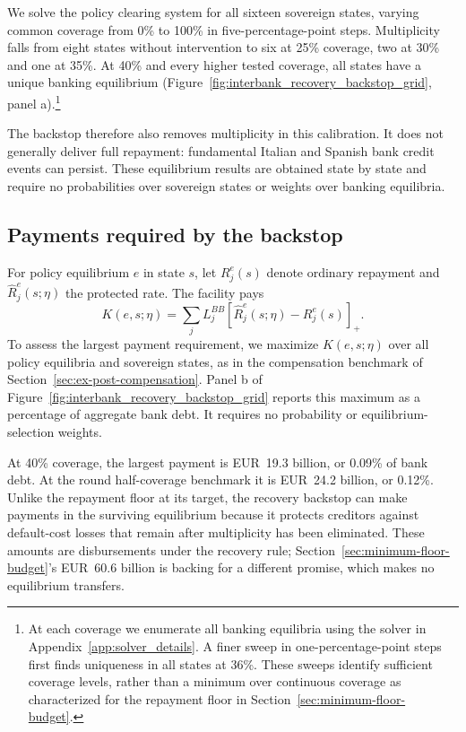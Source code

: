 We solve the policy clearing system for all sixteen sovereign states, varying common coverage from 0\% to 100\% in five-percentage-point steps. Multiplicity falls from eight states without intervention to six at 25\% coverage, two at 30\% and one at 35\%. At 40\% and every higher tested coverage, all states have a unique banking equilibrium (Figure~\ref{fig:interbank_recovery_backstop_grid}, panel a).\footnote{At each coverage we enumerate all banking equilibria using the solver in Appendix~\ref{app:solver_details}. A finer sweep in one-percentage-point steps first finds uniqueness in all states at 36\%. These sweeps identify sufficient coverage levels, rather than a minimum over continuous coverage as characterized for the repayment floor in Section~\ref{sec:minimum-floor-budget}.}

The backstop therefore also removes multiplicity in this calibration. It does not generally deliver full repayment: fundamental Italian and Spanish bank credit events can persist. These equilibrium results are obtained state by state and require no probabilities over sovereign states or weights over banking equilibria.

\subsection{Payments required by the backstop}

For policy equilibrium $e$ in state $s$, let $R_j^e(s)$ denote ordinary repayment and $\widehat R_j^e(s;\eta)$ the protected rate. The facility pays
\begin{equation}
 K(e,s;\eta)=\sum_jL_j^{BB}[\widehat R_j^e(s;\eta)-R_j^e(s)]_+.
 \label{eq:interbank_backstop_cost}
\end{equation}
To assess the largest payment requirement, we maximize $K(e,s;\eta)$ over all policy equilibria and sovereign states, as in the compensation benchmark of Section~\ref{sec:ex-post-compensation}. Panel b of Figure~\ref{fig:interbank_recovery_backstop_grid} reports this maximum as a percentage of aggregate bank debt. It requires no probability or equilibrium-selection weights.

At 40\% coverage, the largest payment is EUR~19.3 billion, or 0.09\% of bank debt. At the round half-coverage benchmark it is EUR~24.2 billion, or 0.12\%. Unlike the repayment floor at its target, the recovery backstop can make payments in the surviving equilibrium because it protects creditors against default-cost losses that remain after multiplicity has been eliminated. These amounts are disbursements under the recovery rule; Section~\ref{sec:minimum-floor-budget}'s EUR~60.6 billion is backing for a different promise, which makes no equilibrium transfers.

